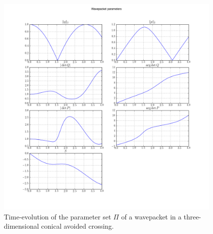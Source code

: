 \begin{figure}
  \centering
  \includegraphics[width=\linewidth]{./results/conic_avoided_3d/wavepacket_parameters_abs_ang_block0.png}
  \caption{Time-evolution of the parameter set $\Pi$ of a wavepacket in a
           three-dimensional conical avoided crossing.}
  \label{fig:ca3d_parameters}
\end{figure}

